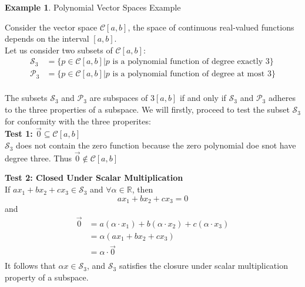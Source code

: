 \documentclass{book}
\theoremstyle{definition}
\newtheorem{example}{Example}[definition]
\theoremstyle{remark}
\newcommand{\bb}[1]{\mathbb{#1}}
\newcommand{\cc}[1]{\mathcal{#1}}
\newcommand{\m}{\cdot}
\begin{document}
\newpage
\begin{example}
Polynomial Vector Spaces Example \\

    \begin{tcolorbox}
        Consider the vector space $\cc{C}[a,b]$, the space of continuous real-valued functions depends on the interval $[a,b]$. \\
        Let us consider two subsets of $\cc{C}[a,b]$: \\
            \begin{align*}
                \cc{S}_3 & = \{ p \in \cc{C}[a,b] | p \text{ is a polynomial function of degree exactly $3$} \} \\
                \cc{P}_3 & = \{ p \in \cc{C}[a,b] | p \text{ is a polynomial function of degree at most $3$} \} \\
            \end{align*}
    \end{tcolorbox}
        
    The subsets $\cc{S}_3$ and $\cc{P}_3$ are subspaces of $\cc{3}[a,b]$ if and only if $\cc{S}_3$ and $\cc{P}_3$ adheres to the three properties of a subspace. We will firstly, proceed to test the subset $\cc{S}_3$ for conformity with the three properites: \\
        
        \textbf{Test 1: $\vec{0} \subseteq \cc{C}[a,b]$} \\
            $\cc{S}_3$ does not contain the zero function because the zero polynomial doe snot have degree three. Thus $\vec{0} \notin \cc{C}[a,b]$ 
    
        \textbf{Test 2: Closed Under Scalar Multiplication} \\
            If $ax_1 + bx_2 + cx_3 \in \cc{S}_3$ and $\forall \alpha \in \bb{R}$, then 
                \begin{equation*}
                    ax_1 + bx_2 + cx_3 = 0
                \end{equation*}
            and 
                \begin{align*}
                    \vec{0} & = a(\alpha \m x_1) + b(\alpha \m x_2) + c(\alpha \m x_3) \\
                        & = \alpha(ax_1 + bx_2 + cx_3) \\
                        & = \alpha \m \vec{0} \\
                \end{align*}
            It follows that $\alpha x \in \cc{S}_3$, and $\cc{S}_3$ satisfies the closure under scalar multiplication property of a subspace. \\
        

\end{example}
\end{document}

